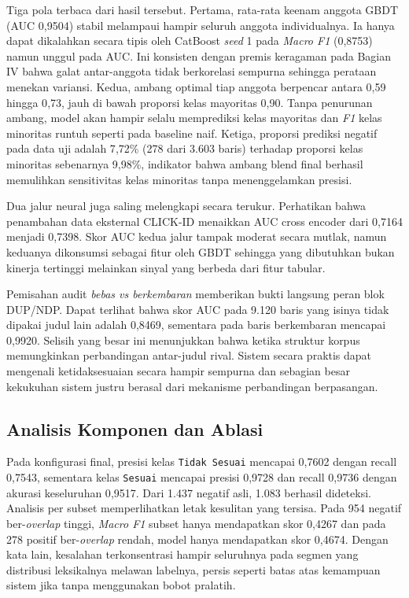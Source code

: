 Tiga pola terbaca dari hasil tersebut. Pertama, rata-rata keenam anggota GBDT (AUC 0{,}9504) stabil melampaui hampir seluruh anggota individualnya. Ia hanya dapat dikalahkan secara tipis oleh CatBoost \textit{seed} 1 pada \textit{Macro F1} (0{,}8753) namun unggul pada AUC. Ini konsisten dengan premis keragaman pada Bagian IV bahwa galat antar-anggota tidak berkorelasi sempurna sehingga perataan menekan variansi. Kedua, ambang optimal tiap anggota berpencar antara 0{,}59 hingga 0{,}73, jauh di bawah proporsi kelas mayoritas 0{,}90. Tanpa penurunan ambang, model akan hampir selalu memprediksi kelas mayoritas dan \textit{F1} kelas minoritas runtuh seperti pada baseline naif. Ketiga, proporsi prediksi negatif pada data uji adalah 7{,}72\% (278 dari 3.603 baris) terhadap proporsi kelas minoritas sebenarnya 9{,}98\%, indikator bahwa ambang blend final berhasil memulihkan sensitivitas kelas minoritas tanpa menenggelamkan presisi.

Dua jalur neural juga saling melengkapi secara terukur. Perhatikan bahwa penambahan data eksternal CLICK-ID menaikkan AUC cross encoder dari 0{,}7164 menjadi 0{,}7398. Skor AUC kedua jalur tampak moderat secara mutlak, namun keduanya dikonsumsi sebagai fitur oleh GBDT sehingga yang dibutuhkan bukan kinerja tertinggi melainkan sinyal yang berbeda dari fitur tabular.

Pemisahan audit \textit{bebas vs berkembaran} memberikan bukti langsung peran blok DUP/NDP. Dapat terlihat bahwa skor AUC pada 9.120 baris yang isinya tidak dipakai judul lain adalah 0{,}8469, sementara pada baris berkembaran mencapai 0{,}9920. Selisih yang besar ini menunjukkan bahwa ketika struktur korpus memungkinkan perbandingan antar-judul rival.  Sistem secara praktis dapat mengenali ketidaksesuaian secara hampir sempurna dan sebagian besar kekukuhan sistem justru berasal dari mekanisme perbandingan berpasangan.

\subsection{Analisis Komponen dan Ablasi}
Pada konfigurasi final, presisi kelas \texttt{Tidak Sesuai} mencapai 0{,}7602 dengan recall 0{,}7543, sementara kelas \texttt{Sesuai} mencapai presisi 0{,}9728 dan recall 0{,}9736 dengan akurasi keseluruhan 0{,}9517. Dari 1.437 negatif asli, 1.083 berhasil dideteksi. Analisis per subset memperlihatkan letak kesulitan yang tersisa. Pada 954 negatif ber-\textit{overlap} tinggi, \textit{Macro F1} subset hanya mendapatkan skor 0{,}4267 dan pada 278 positif ber-\textit{overlap} rendah, model hanya mendapatkan skor 0{,}4674. Dengan kata lain, kesalahan terkonsentrasi hampir seluruhnya pada segmen yang distribusi leksikalnya melawan labelnya, persis seperti batas atas kemampuan sistem jika tanpa menggunakan bobot pralatih.

